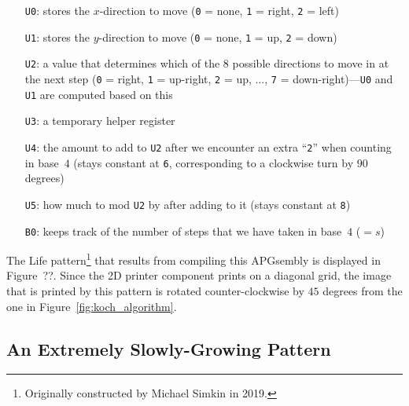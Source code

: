 \begin{itemize}
	\item[\texttt{U0}:] stores the $x$-direction to move (\texttt{0} = none, \texttt{1} = right, \texttt{2} = left)
	
	\item[\texttt{U1}:] stores the $y$-direction to move (\texttt{0} = none, \texttt{1} = up, \texttt{2} = down)
	
	\item[\texttt{U2}:] a value that determines which of the 8 possible directions to move in at the next step (\texttt{0} = right, \texttt{1} = up-right, \texttt{2} = up, ..., \texttt{7} = down-right)---\texttt{U0} and \texttt{U1} are computed based on this
	
	\item[\texttt{U3}:] a temporary helper register
	
	\item[\texttt{U4}:] the amount to add to \texttt{U2} after we encounter an extra ``\texttt{2}'' when counting in base~$4$ (stays constant at \texttt{6}, corresponding to a clockwise turn by $90$ degrees)
	
	\item[\texttt{U5}:] how much to mod \texttt{U2} by after adding to it (stays constant at \texttt{8})\medskip
	
	\item[\texttt{B0}:] keeps track of the number of steps that we have taken in base~$4$ ($= s$)\medskip
\end{itemize}

The Life pattern\footnote{Originally constructed by Michael Simkin in 2019.} that results from compiling this APGsembly is displayed in Figure~??. Since the 2D printer component prints on a diagonal grid, the image that is printed by this pattern is rotated counter-clockwise by $45$ degrees from the one in Figure~\ref{fig:koch_algorithm}.




\subsection{An Extremely Slowly-Growing Pattern}\label{sec:Osqrtlogt}

